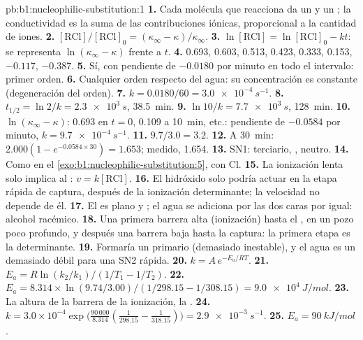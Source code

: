 \begin{solution}{pb:b1:nucleophilic-substitution:1}
\textbf{1.} Cada molécula que reacciona da un  y un ; la
conductividad es la suma de las contribuciones iónicas, proporcional a la
cantidad de iones.
\textbf{2.} $[\mathrm{RCl}]/[\mathrm{RCl}]_0 = (\kappa_\infty -
\kappa)/\kappa_\infty$.
\textbf{3.} $\ln[\mathrm{RCl}] = \ln[\mathrm{RCl}]_0 - kt$: se representa
$\ln(\kappa_\infty - \kappa)$ frente a $t$.
\textbf{4.} 0.693, 0.603, 0.513, 0.423, 0.333, 0.153, $-0.117$, $-0.387$.
\textbf{5.} Sí, con pendiente de $-0.0180$ por minuto en todo el
intervalo: primer orden.
\textbf{6.} Cualquier orden respecto del agua: su concentración es
constante (degeneración del orden).
\textbf{7.} $k = 0.0180/60 = \qty{3.0e-4}{s^{-1}}$.
\textbf{8.} $t_{1/2} = \ln 2/k = \qty{2.3e3}{s}$, \qty{38.5}{min}.
\textbf{9.} $\ln 10/k = \qty{7.7e3}{s}$, \qty{128}{min}.
\textbf{10.} $\ln(\kappa_\infty - \kappa)$: 0.693 en $t = 0$, 0.109 a
\qty{10}{min}, etc.: pendiente de $-0.0584$ por minuto,
$k = \qty{9.7e-4}{s^{-1}}$.
\textbf{11.} $9.7/3.0 = 3.2$.
\textbf{12.} A \qty{30}{min}: $2.000(1 - e^{-0.0584 \times 30}) = 1.653$;
medido, 1.654.
\textbf{13.} SN1:  terciario, , 
neutro.
\textbf{14.} Como en el \cref{exo:b1:nucleophilic-substitution:5}, con
Cl.
\textbf{15.} La ionización lenta solo implica al : $v =
k[\mathrm{RCl}]$.
\textbf{16.} El hidróxido solo podría actuar en la etapa rápida de
captura, después de la ionización determinante; la velocidad no depende
de él.
\textbf{17.} El  es plano y ; el agua se adiciona por
las dos caras por igual: alcohol racémico.
\textbf{18.} Una primera barrera alta (ionización) hasta el ,
en un pozo poco profundo, y después una barrera baja hasta la captura: la
primera etapa es la determinante.
\textbf{19.} Formaría un  primario (demasiado inestable), y el
agua es un  demasiado débil para una SN2 rápida.
\textbf{20.} $k = A\,e^{-E_a/RT}$.
\textbf{21.} $E_a = R\ln(k_2/k_1)/(1/T_1 - 1/T_2)$.
\textbf{22.} $E_a = 8.314 \times \ln(9.74/3.00)/(1/298.15 - 1/308.15) =
\qty{9.0e4}{J/mol}$.
\textbf{23.} La altura de la barrera de la ionización, la .
\textbf{24.} $k = 3.0 \times 10^{-4} \exp\bigl(\frac{90\,000}{8.314}
(\frac{1}{298.15} - \frac{1}{318.15})\bigr) = \qty{2.9e-3}{s^{-1}}$.
\textbf{25.} \textbf{$E_a = \qty{90}{kJ/mol}$}.
\end{solution}
